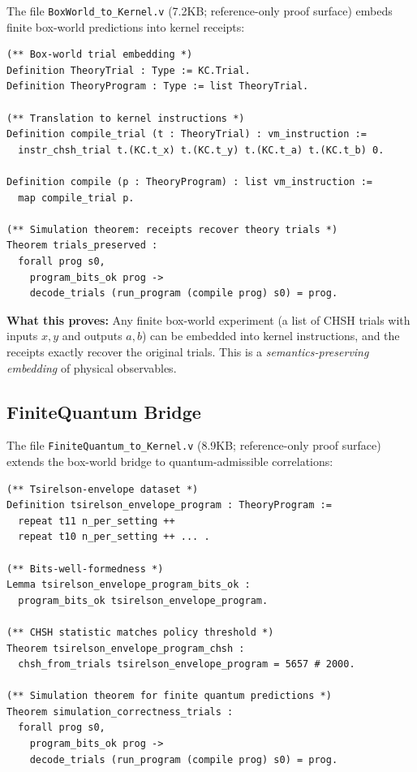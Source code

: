 The file \texttt{BoxWorld\_to\_Kernel.v} (7.2KB; reference-only proof surface) embeds finite box-world predictions into kernel receipts:

\begin{lstlisting}
(** Box-world trial embedding *)
Definition TheoryTrial : Type := KC.Trial.
Definition TheoryProgram : Type := list TheoryTrial.

(** Translation to kernel instructions *)
Definition compile_trial (t : TheoryTrial) : vm_instruction :=
  instr_chsh_trial t.(KC.t_x) t.(KC.t_y) t.(KC.t_a) t.(KC.t_b) 0.

Definition compile (p : TheoryProgram) : list vm_instruction :=
  map compile_trial p.

(** Simulation theorem: receipts recover theory trials *)
Theorem trials_preserved :
  forall prog s0,
    program_bits_ok prog ->
    decode_trials (run_program (compile prog) s0) = prog.
\end{lstlisting}

\textbf{What this proves:} Any finite box-world experiment (a list of CHSH trials with inputs $x,y$ and outputs $a,b$) can be embedded into kernel instructions, and the receipts exactly recover the original trials. This is a \textit{semantics-preserving embedding} of physical observables.

\subsection{FiniteQuantum Bridge}

The file \texttt{FiniteQuantum\_to\_Kernel.v} (8.9KB; reference-only proof surface) extends the box-world bridge to quantum-admissible correlations:

\begin{lstlisting}
(** Tsirelson-envelope dataset *)
Definition tsirelson_envelope_program : TheoryProgram :=
  repeat t11 n_per_setting ++
  repeat t10 n_per_setting ++ ... .

(** Bits-well-formedness *)
Lemma tsirelson_envelope_program_bits_ok :
  program_bits_ok tsirelson_envelope_program.

(** CHSH statistic matches policy threshold *)
Theorem tsirelson_envelope_program_chsh :
  chsh_from_trials tsirelson_envelope_program = 5657 # 2000.

(** Simulation theorem for finite quantum predictions *)
Theorem simulation_correctness_trials :
  forall prog s0,
    program_bits_ok prog ->
    decode_trials (run_program (compile prog) s0) = prog.
\end{lstlisting}


